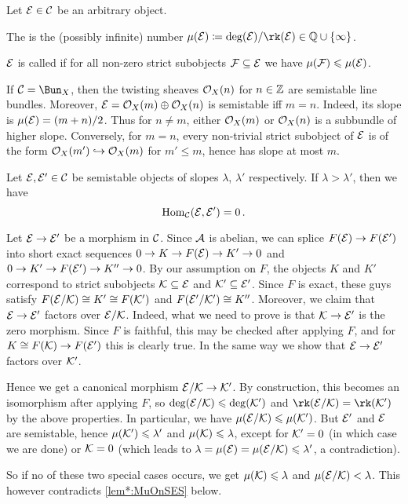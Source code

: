 \documentclass[a4paper, 10pt, oneside, DIV=9, chapterprefix=true, numbers=enddot,bibliography=totoc]{scrbook}
\begin{document}
\begin{defi}
	Let $\mathcal{E}\in \mathcal{C}$ be an arbitrary object.
	\begin{numerate}
		\item The  is the (possibly infinite) number $\mu(\Ee)\coloneqq \deg(\Ee)/\rk(\Ee)\in \IQ\cup\{\infty\}$.
		\item $\mathcal{E}$ is called  if for all non-zero strict subobjects $\mathcal{F}\subseteq \mathcal{E}$ we have $\mu(\mathcal{F})\leqslant \mu(\mathcal{E})$.
	\end{numerate}
\end{defi}
\begin{exm}
	If $\Cc=\Bun_X$, then the twisting sheaves $\mathcal{O}_X(n)$ for $n\in \mathbb{Z}$ are semistable line bundles. Moreover, $\mathcal{E}=\mathcal{O}_X(m)\oplus \mathcal{O}_X(n)$ is semistable iff $m=n$. Indeed, its slope is $\mu(\mathcal{E})=(m+n)/2$. Thus for $n\neq m$, either $\mathcal{O}_X(m)$ or $\mathcal{O}_X(n)$ is a subbundle of higher slope. Conversely, for $m=n$, every non-trivial strict subobject of $\mathcal{E}$ is of the form $\Oo_X(m')\monomorphism \Oo_X(m)$ for $m'\leq m$, hence has slope at most $m$.
\end{exm}
\begin{lem}\label{lem:HN}
	Let $\mathcal{E},\mathcal{E}'\in \mathcal{C}$ be semistable objects of slopes $\lambda$, $\lambda'$ respectively. If $\lambda>\lambda'$, then we have
	\begin{equation*}
		\operatorname{Hom}_{\mathcal{C}}(\mathcal{E},\mathcal{E}')=0\,.
	\end{equation*}
\end{lem}
\begin{proof*}
	Let $\Ee\morphism \Ee'$ be a morphism in $\mathcal{C}$. Since $\mathcal{A}$ is abelian, we can splice $F(\Ee)\morphism F(\Ee')$ into short exact sequences $0\morphism K\morphism F(\Ee)\morphism K'\morphism 0$ and $0\morphism K'\morphism F(\Ee')\morphism K''\morphism 0$. By our assumption on $F$, the objects $K$ and $K'$ correspond to strict subobjects $\mathcal{K}\subseteq \mathcal{E}$ and $\mathcal{K}'\subseteq \mathcal{E}'$. Since $F$ is exact, these guys satisfy $F(\mathcal{E}/\mathcal{K})\cong K'\cong F(\mathcal{K}')$ and $F(\mathcal{E}'/\mathcal{K}')\cong K''$. Moreover, we claim that $\Ee\morphism \Ee'$ factors over $\mathcal{E}/\mathcal{K}$. Indeed, what we need to prove is that $\Kk\morphism\Ee'$ is the zero morphism. Since $F$ is faithful, this may be checked after applying $F$, and for $K\cong F(\Kk)\morphism F(\Ee')$ this is clearly true. In the same way we show that $\Ee\morphism \Ee'$ factors over $\mathcal{K}'$.
	
	Hence we get a canonical morphism $\Ee/\Kk\morphism \Kk'$. By construction, this becomes an isomorphism after applying $F$, so $\deg(\mathcal{E}/\mathcal{K})\leqslant \deg(\mathcal{K}')$ and $\rk (\Ee/\Kk)=\rk (\Kk')$ by the above properties. In particular, we have $\mu(\mathcal{E}/\mathcal{K})\leqslant \mu(\mathcal{K}')$. But $\mathcal{E}'$ and $\mathcal{E}$ are semistable, hence $\mu(\mathcal{K}')\leqslant \lambda'$ and $\mu(\mathcal{K})\leqslant \lambda$, except for $\mathcal{K}'=0$ (in which case we are done) or $\mathcal{K}=0$ (which leads to $\lambda=\mu(\mathcal{E})=\mu(\mathcal{E}/\mathcal{K})\leqslant \lambda'$, a contradiction).
	
	So if no of these two special cases occurs, we get $\mu(\mathcal{K})\leqslant \lambda$ and $\mu(\mathcal{E}/\mathcal{K})<\lambda$. This however contradicts \cref{lem*:MuOnSES} below.
\end{proof*}
\end{document}
